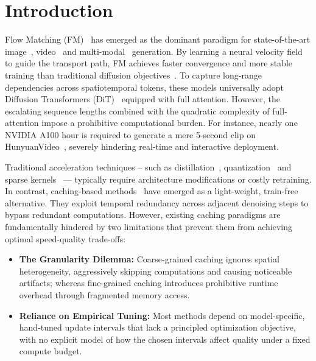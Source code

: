 \section{Introduction}
\label{sec:intro}

Flow Matching (FM)~\cite{flowmatching,rectifiedflow,meanflow} has emerged as the dominant paradigm for state-of-the-art image~\cite{flux,qwenimage}, video~\cite{wan,hunyuan} and multi-modal~\cite{firered,omnidit,hunyuanimage3} generation. 
By learning a neural velocity field to guide the transport path, FM achieves faster convergence and more stable training than traditional diffusion objectives~\cite{ddpm,ddim}.
To capture long-range dependencies across spatiotemporal tokens, these models universally adopt Diffusion Transformers (DiT)~\cite{dit} equipped with full attention. However, the escalating sequence lengths combined with the quadratic complexity of full-attention impose a prohibitive computational burden. For instance, nearly one NVIDIA A100 hour is required to generate a mere 5-second clip on HunyuanVideo~\cite{hunyuan}, severely hindering real-time and interactive deployment.

Traditional acceleration techniques -- such as distillation~\cite{distill1,distill2,distill3}, quantization~\cite{sageattention1,sageattention2,sageattention2+,sageattention3} and sparse kernels~\cite{sparsevideogen,sparsevideogen2} --- typically require architecture modifications or costly retraining. 
In contrast, caching-based methods~\cite{teacache,pab,tokencache,blockdance,meancache,jano} have emerged as a light-weight, train-free alternative. They exploit temporal redundancy across adjacent denoising steps to bypass redundant computations. 
However, existing caching paradigms are fundamentally hindered by two limitations that prevent them from achieving optimal speed-quality trade-offs:
\begin{itemize}
    \item {\textbf{The Granularity Dilemma:}} Coarse-grained caching ignores spatial heterogeneity, aggressively skipping computations and causing noticeable artifacts; whereas fine-grained caching introduces prohibitive runtime overhead through fragmented memory access. 
    \item {\textbf{Reliance on Empirical Tuning:}} Most methods depend on model-specific, hand-tuned update intervals that lack a principled optimization objective, with no explicit model of how the chosen intervals affect quality under a fixed compute budget. 
\end{itemize}

